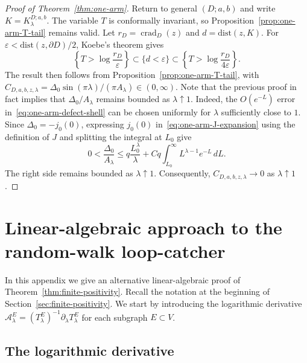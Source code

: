 \documentclass[11pt]{article}
\numberwithin{equation}{section}
\newcommand{\1}{\mathbf{1}}
\newcommand{\dist}{\mathrm{dist}}
\newcommand{\Ac}{\mathcal A}
\begin{document}
\begin{proof}[Proof of Theorem~\ref{thm:one-arm}]
Return to general \((D;a,b)\) and write
\(K=K_\lambda^{D;a,b}\).  The variable \(T\) is conformally invariant, so
Proposition~\ref{prop:one-arm-T-tail} remains valid.  Let
\(r_D=\operatorname{crad}_D(z)\) and \(d=\dist(z,K)\).  For
\(\varepsilon<\dist(z,\partial D)/2\), Koebe's theorem gives
\begin{equation*}
 \left\{T>\log\frac{r_D}{\varepsilon}\right\}
 \subset\{d<\varepsilon\}
 \subset\left\{T>\log\frac{r_D}{4\varepsilon}\right\}.
\end{equation*}
The result then follows from Proposition~\ref{prop:one-arm-T-tail}, with \(C_{D,a,b,z,\lambda}
=\Delta_0\sin(\pi\lambda)/(\pi A_\lambda)\in(0,\infty)\). Note that the previous proof in fact implies that \(\Delta_0/A_\lambda\) remains bounded as \(\lambda \uparrow 1\). Indeed, the $O(e^{-L})$ error in~\eqref{eq:one-arm-defect-shell} can be chosen uniformly
for $\lambda$ sufficiently close to $1$. Since
$\Delta_0=-j_0(0)$, 
expressing $j_0(0)$ in~\eqref{eq:one-arm-J-expansion} using the
definition of $J$ and splitting the integral at $L_0$
give
\[
0<\frac{\Delta_0}{A_\lambda}
\leq
q\frac{L_0^\lambda}{\lambda}
+Cq\int_{L_0}^{\infty}L^{\lambda-1}e^{-L}\,dL.
\]
The right side remains bounded as $\lambda \uparrow 1$.
Consequently, \(C_{D,a,b,z,\lambda}\to 0\) as \(\lambda \uparrow 1\).
\end{proof}

\appendix
\section{Linear-algebraic approach to the random-walk loop-catcher}\label{app:finite-positivity}

In this appendix we give an alternative linear-algebraic proof of Theorem~\ref{thm:finite-positivity}.
Recall the notation at the beginning of Section~\ref{sec:finite-positivity}.  
We start by introducing the logarithmic derivative
\(\Ac_\lambda^E=(T_\lambda^E)^{-1}\partial_\lambda T_\lambda^E\) for each
subgraph \(E\subset V\).

\subsection{The logarithmic derivative}
\label{subsec:log-derivative}
\end{document}
